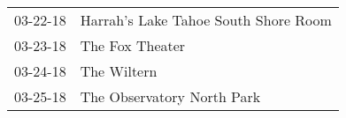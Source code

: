 \begin{supertabular}{p{0.25\columnwidth}p{0.75\columnwidth}}
 03-22-18 &  Harrah’s Lake Tahoe South Shore Room \\
 03-23-18 &                       The Fox Theater \\
 03-24-18 &                           The Wiltern \\
 03-25-18 &            The Observatory North Park \\
\end{supertabular}
